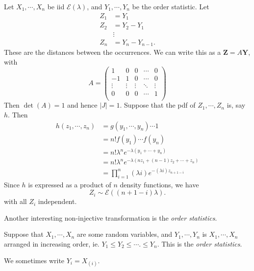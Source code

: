 \documentclass[a4paper]{article}
\begin{document}
\begin{eg}
  Let $X_1, \cdots, X_n$ be iid $\mathcal{E}(\lambda)$, and $Y_1, \cdots, Y_n$ be the order statistic. Let
  \begin{align*}
    Z_1 &= Y_1\\
    Z_2 &= Y_2 - Y_1\\
    &\vdots\\
    Z_n &= Y_n - Y_{n - 1}.
  \end{align*}
  These are the distances between the occurrences. We can write this as a $\mathbf{Z} = A\mathbf{Y}$, with
  \[
    A =
    \begin{pmatrix}
      1 & 0 & 0 & \cdots&  0\\
      -1 & 1 & 0 & \cdots & 0\\
      \vdots & \vdots & \vdots & \ddots & \vdots\\
      0 & 0 & 0 & \cdots & 1\\
    \end{pmatrix}
  \]
  Then $\det (A) = 1$ and hence $|J| = 1$. Suppose that the pdf of $Z_1, \cdots, Z_n$ is, say $h$. Then
  \begin{align*}
    h(z_1, \cdots, z_n) &= g(y_1, \cdots, y_n)\cdots 1\\
    &= n!f(y_1) \cdots f(y_n)\\
    &= n!\lambda^n e^{-\lambda (y_1 + \cdots + y_n)}\\
    &= n!\lambda^n e^{-\lambda (nz_1 + (n - 1)z_2 + \cdots + z_n)}\\
    &= \prod_{i = 1}^n (\lambda i)e^{-(\lambda i)z_{n + 1 - i}}
  \end{align*}
  Since $h$ is expressed as a product of $n$ density functions, we have
  \[
    Z_i \sim \mathcal{E}((n + 1 - i)\lambda).
  \]
  with all $Z_i$ independent.
\end{eg}

Another interesting non-injective transformation is the \emph{order statistics}.
\begin{defi}
  Suppose that $X_1, \cdots, X_n$ are some random variables, and $Y_1, \cdots, Y_n$ is $X_1, \cdots, X_n$ arranged in increasing order, ie. $Y_1 \leq Y_2 \leq \cdots. \leq Y_n$. This is the \emph{order statistics}.

  We sometimes write $Y_i = X_{(i)}$.
\end{defi}
\end{document}
